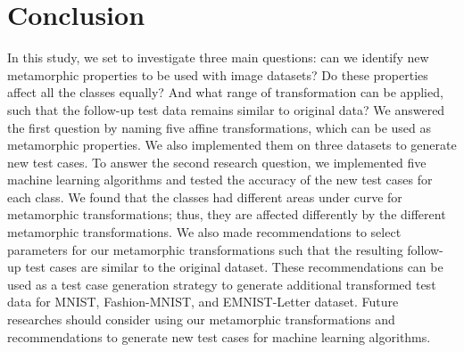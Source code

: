 \section{Conclusion}
In this study, we set to investigate three main questions: can we identify new metamorphic properties to be used with image datasets? Do these properties affect all the classes equally? And what range of transformation can be applied, such that the follow-up test data remains similar to original data? We answered the first question by naming five affine transformations, which can be used as metamorphic properties. We also implemented them on three datasets to generate new test cases. To answer the second research question, we implemented five machine learning algorithms and tested the accuracy of the new test cases for each class. We found that the classes had different areas under curve for metamorphic transformations; thus, they are affected differently by the different metamorphic transformations. 
We also made recommendations to select parameters for our metamorphic transformations such that the resulting follow-up test cases are similar to the original dataset. These recommendations can be used as a test case generation strategy to generate additional transformed test data for MNIST, Fashion-MNIST, and EMNIST-Letter dataset. Future researches should consider using our metamorphic transformations and recommendations to generate new test cases for machine learning algorithms.